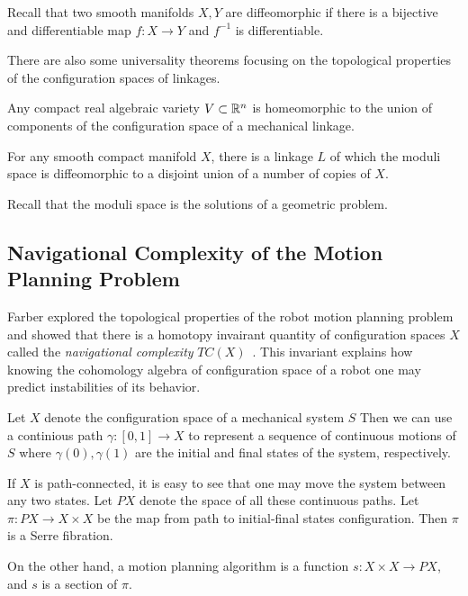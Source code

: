 Recall that two smooth manifolds \(X, Y\) are diffeomorphic if there is a bijective and differentiable map \(f:X\to Y\) and \(f^{-1}\) is differentiable.

There are also some universality theorems focusing on the topological properties of the configuration spaces of linkages.

\begin{theorem}
  Any compact real algebraic variety \(V\subset \mathbb{R}^n\) is homeomorphic to the union of components of the configuration space of a mechanical linkage.
\end{theorem}

\begin{theorem}
  For any smooth compact manifold \(X\), there is a linkage \(L\) of which the moduli space is diffeomorphic to a disjoint union of a number of copies of \(X\).
\end{theorem}
Recall that the moduli space is the solutions of a geometric problem.

\subsection{Navigational Complexity of the Motion Planning Problem}
Farber explored the topological properties of the robot motion planning problem and showed that there is a homotopy invairant quantity of configuration spaces \(X\) called the \textit{navigational complexity} \(TC(X)\)~\cite{farber2003topological,farber2004instabilities}.
This invariant  explains how knowing the cohomology algebra of
configuration space of a robot one may predict instabilities of its behavior.

Let \(X\) denote the configuration space of a mechanical system \(S\)
Then we can use a continious path \(\gamma:[0,1]\to X\) to represent a sequence of continuous motions of \(S\) where \(\gamma(0),\gamma(1)\) are the initial and final states of the system, respectively.

If \(X\) is path-connected, it is easy to see that one may move the system between any two states.
Let \(PX\) denote the space of all these continuous paths.
Let \(\pi:PX\to X\times X\) be the map from path to initial-final states configuration.
Then \(\pi\) is a Serre fibration.

On the other hand, a motion planning algorithm is a function \(s:X\times X\to PX\), and \(s\) is a section of \(\pi\).

